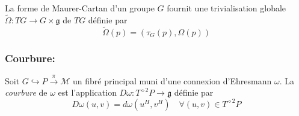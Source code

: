 \documentclass[12pt, a4paper]{book}
\begin{document}
\begin{pro}
La forme de Maurer-Cartan d'un groupe $G$ fournit une trivialisation globale $\tilde{\Omega} : TG \to G\times \mathfrak{g}$ de $TG$ définie par
$$\tilde{\Omega}(p) = (\tau_G(p), \Omega(p))$$
\end{pro}

\subsubsection{Courbure:} 

\begin{defi}[Courbure]
Soit $G \hookrightarrow P \overset{\pi}{\to} \mathcal{M}$ un fibré principal muni d'une connexion d'Ehresmann $\omega$. La \emph{courbure} de $\omega$ est l'application $D\omega : T^{\diamond 2}P \to \mathfrak{g}$ définie par 
$$D\omega(u,v) = d\omega(u^H, v^H) \quad \forall (u,v)\in T^{\diamond 2}P$$
\end{defi}
\end{document}
